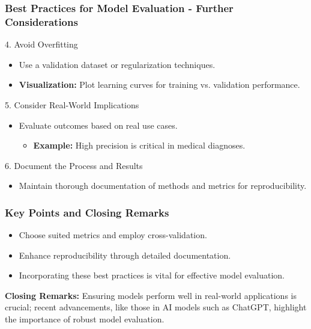 \documentclass[aspectratio=169]{beamer}
\begin{document}
\begin{frame}[fragile]
    \frametitle{Best Practices for Model Evaluation - Further Considerations}
    \begin{block}{4. Avoid Overfitting}
        \begin{itemize}
            \item Use a validation dataset or regularization techniques.
            \item \textbf{Visualization:} Plot learning curves for training vs. validation performance.
        \end{itemize}
    \end{block}

    \begin{block}{5. Consider Real-World Implications}
        \begin{itemize}
            \item Evaluate outcomes based on real use cases.
            \begin{itemize}
                \item \textbf{Example:} High precision is critical in medical diagnoses.
            \end{itemize}
        \end{itemize}
    \end{block}

    \begin{block}{6. Document the Process and Results}
        \begin{itemize}
            \item Maintain thorough documentation of methods and metrics for reproducibility.
        \end{itemize}
    \end{block}
\end{frame}

\begin{frame}[fragile]
    \frametitle{Key Points and Closing Remarks}
    \begin{itemize}
        \item Choose suited metrics and employ cross-validation.
        \item Enhance reproducibility through detailed documentation.
        \item Incorporating these best practices is vital for effective model evaluation.
    \end{itemize}
    
    \textbf{Closing Remarks:} Ensuring models perform well in real-world applications is crucial; recent advancements, like those in AI models such as ChatGPT, highlight the importance of robust model evaluation.
\end{frame}
\end{document}
